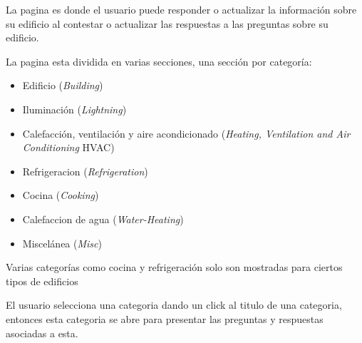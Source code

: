 La pagina  es donde el usuario
puede responder o actualizar la información sobre su edificio al contestar
o actualizar las respuestas a las preguntas sobre su edificio.

La pagina esta dividida en varias secciones, una sección por categoría:
\begin{itemize}
\item Edificio (\textit{Building})
\item Iluminación (\textit{Lightning})
\item Calefacción, ventilación y aire acondicionado (\textit{Heating, Ventilation and Air Conditioning} HVAC)
\item Refrigeracion (\textit{Refrigeration})
\item Cocina (\textit{Cooking})
\item Calefaccion de agua (\textit{Water-Heating})
\item Miscelánea (\textit{Misc})
\end{itemize}

Varias categorías como cocina y refrigeración solo son mostradas
para ciertos tipos de edificios


El usuario selecciona una categoria dando un click al titulo de una categoria,
entonces esta categoria se abre para presentar las preguntas y respuestas
asociadas a esta.

